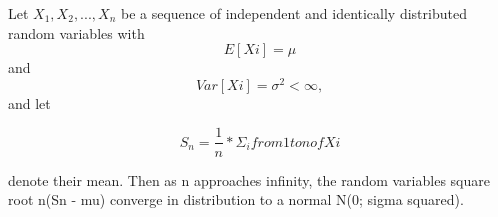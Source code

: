 \documentclass{article}
\begin{document}

Let $X_1, X_2, ..., X_n$ be a sequence of independent and
identically distributed random variables with
\begin{equation*}E[Xi] = \mu\end{equation*} and \begin{equation*}Var[Xi] = \sigma ^ 2 < \infty,\end{equation*} 
and let

\begin{equation*}S_n = \frac{1}{n} * \Sigma_i from 1 to n of Xi\end{equation*}

denote their mean. Then as n approaches infinity, the
random variables square root n(Sn - mu) converge in
distribution to a normal N(0; sigma squared).
\end{document}
